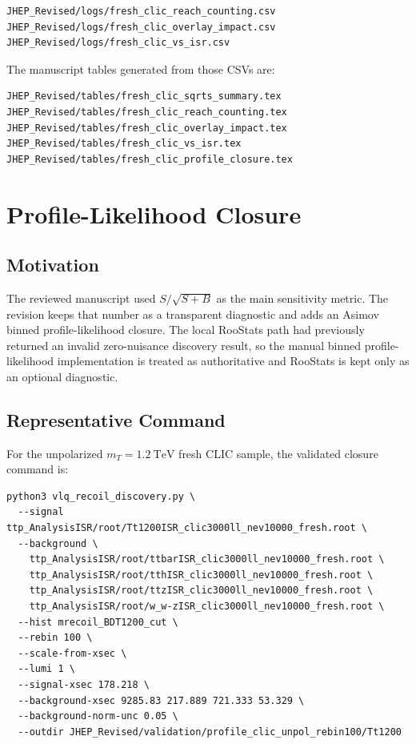 \documentclass[11pt]{article}
\begin{document}
\begin{lstlisting}
JHEP_Revised/logs/fresh_clic_reach_counting.csv
JHEP_Revised/logs/fresh_clic_overlay_impact.csv
JHEP_Revised/logs/fresh_clic_vs_isr.csv
\end{lstlisting}

The manuscript tables generated from those CSVs are:

\begin{lstlisting}
JHEP_Revised/tables/fresh_clic_sqrts_summary.tex
JHEP_Revised/tables/fresh_clic_reach_counting.tex
JHEP_Revised/tables/fresh_clic_overlay_impact.tex
JHEP_Revised/tables/fresh_clic_vs_isr.tex
JHEP_Revised/tables/fresh_clic_profile_closure.tex
\end{lstlisting}

\section{Profile-Likelihood Closure}

\subsection{Motivation}

The reviewed manuscript used $S/\sqrt{S+B}$ as the main sensitivity metric.
The revision keeps that number as a transparent diagnostic and adds an Asimov
binned profile-likelihood closure.  The local RooStats path had previously
returned an invalid zero-nuisance discovery result, so the manual binned
profile-likelihood implementation is treated as authoritative and RooStats is
kept only as an optional diagnostic.

\subsection{Representative Command}

For the unpolarized $m_T=1.2~\mathrm{TeV}$ fresh CLIC sample, the validated
closure command is:

\begin{lstlisting}
python3 vlq_recoil_discovery.py \
  --signal ttp_AnalysisISR/root/Tt1200ISR_clic3000ll_nev10000_fresh.root \
  --background \
    ttp_AnalysisISR/root/ttbarISR_clic3000ll_nev10000_fresh.root \
    ttp_AnalysisISR/root/tthISR_clic3000ll_nev10000_fresh.root \
    ttp_AnalysisISR/root/ttzISR_clic3000ll_nev10000_fresh.root \
    ttp_AnalysisISR/root/w_w-zISR_clic3000ll_nev10000_fresh.root \
  --hist mrecoil_BDT1200_cut \
  --rebin 100 \
  --scale-from-xsec \
  --lumi 1 \
  --signal-xsec 178.218 \
  --background-xsec 9285.83 217.889 721.333 53.329 \
  --background-norm-unc 0.05 \
  --outdir JHEP_Revised/validation/profile_clic_unpol_rebin100/Tt1200
\end{lstlisting}
\end{document}
